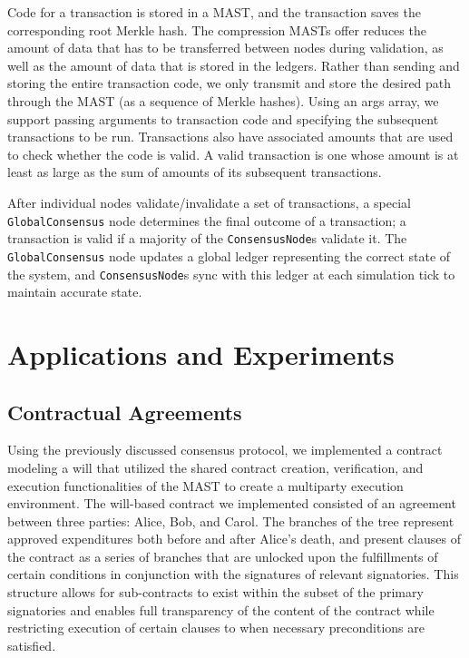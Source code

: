 \documentclass{vldb}
\begin{document}
Code for a transaction is stored in a MAST, and the transaction saves the
corresponding root Merkle hash. The compression MASTs offer reduces the amount
of data that has to be transferred between nodes during validation, as well as
the amount of data that is stored in the ledgers. Rather than sending and
storing the entire transaction code, we only transmit and store the desired path through
the MAST (as a sequence of Merkle hashes). Using an args array, we support
passing arguments to transaction code and specifying the subsequent
transactions to be run. Transactions also have associated amounts that are used
to check whether the code is valid. A valid transaction is one whose amount is
at least as large as the sum of amounts of its subsequent transactions.

After individual nodes validate/invalidate a set of transactions, a special
\texttt{GlobalConsensus} node determines the final outcome of a transaction; a
transaction is valid if a majority of the \texttt{ConsensusNode}s validate it.
The \texttt{GlobalConsensus} node updates a global ledger representing the
correct state of the system, and \texttt{ConsensusNode}s sync with this
ledger at each simulation tick to maintain accurate state.

\section{Applications and Experiments}

\subsection{Contractual Agreements}


Using the previously discussed consensus protocol, we implemented a contract
modeling a will that utilized the shared contract creation, verification, and
execution functionalities of the MAST to create a multiparty execution
environment. The will-based contract we implemented consisted of an agreement
between three parties: Alice, Bob, and Carol. The branches of the tree
represent approved expenditures both before and after Alice’s death, and
present clauses of the contract as a series of branches that are unlocked upon
the fulfillments of certain conditions in conjunction with the signatures of
relevant signatories. This structure allows for sub-contracts to exist within
the subset of the primary signatories and enables full transparency of the
content of the contract while restricting execution of certain clauses to when
necessary preconditions are satisfied.
\end{document}
